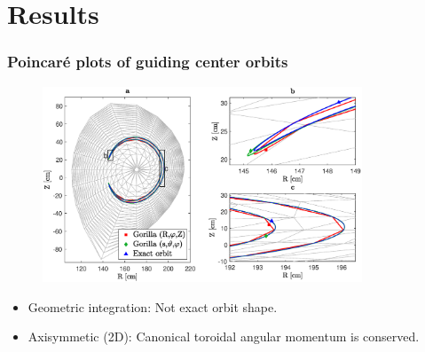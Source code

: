 \documentclass{beamer}
\begin{document}
\section{Results}
\begin{frame}
\frametitle{Poincar\'e plots of guiding center orbits}
\vspace{-1.1cm}
\begin{figure}
	\hspace*{-0.9cm}\includegraphics[trim={0cm 0cm 0cm 0cm},clip,width=0.85\textwidth]{FIGURES/orbit_plot.eps}
\end{figure}
\begin{itemize}
	\vspace*{-0.5cm}
\item Geometric integration: Not exact orbit shape.
\item Axisymmetic (2D): Canonical toroidal angular momentum is conserved.
\end{itemize}
\end{frame}



\end{document}
